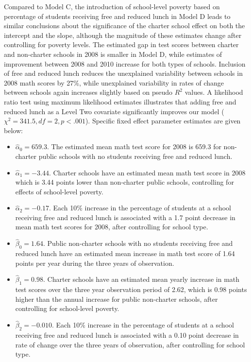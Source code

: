 \documentclass[
]{krantz}
\begin{document}
Compared to Model C, the introduction of school-level poverty based on percentage of students receiving free and reduced lunch in Model D leads to similar conclusions about the significance of the charter school effect on both the intercept and the slope, although the magnitude of these estimates change after controlling for poverty levels. The estimated gap in test scores between charter and non-charter schools in 2008 is smaller in Model D, while estimates of improvement between 2008 and 2010 increase for both types of schools. Inclusion of free and reduced lunch reduces the unexplained variability between schools in 2008 math scores by 27\%, while unexplained variability in rates of change between schools again increases slightly based on pseudo \(R^2\) values. A likelihood ratio test using maximum likelihood estimates illustrates that adding free and reduced lunch as a Level Two covariate significantly improves our model (\(\chi^2 = 341.5, df=2, p<.001\)). Specific fixed effect parameter estimates are given below:

\begin{itemize}
\item
  \(\hat{\alpha}_{0}= 659.3.\) The estimated mean math test score for 2008 is 659.3 for non-charter public schools with no students receiving free and reduced lunch.
\item
  \(\hat{\alpha}_{1}= -3.44.\) Charter schools have an estimated mean math test score in 2008 which is 3.44 points lower than non-charter public schools, controlling for effects of school-level poverty.
\item
  \(\hat{\alpha}_{2}= -0.17.\) Each 10\% increase in the percentage of students at a school receiving free and reduced lunch is associated with a 1.7 point decrease in mean math test scores for 2008, after controlling for school type.
\item
  \(\hat{\beta}_{0}= 1.64.\) Public non-charter schools with no students receiving free and reduced lunch have an estimated mean increase in math test score of 1.64 points per year during the three years of observation.
\item
  \(\hat{\beta}_{1}= 0.98.\) Charter schools have an estimated mean yearly increase in math test scores over the three year observation period of 2.62, which is 0.98 points higher than the annual increase for public non-charter schools, after controlling for school-level poverty.
\item
  \(\hat{\beta}_{2}= -0.010.\) Each 10\% increase in the percentage of students at a school receiving free and reduced lunch is associated with a 0.10 point decrease in rate of change over the three years of observation, after controlling for school type.
\end{itemize}
\end{document}
